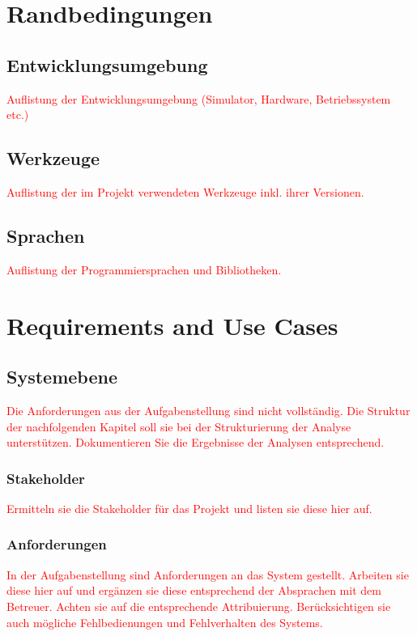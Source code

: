 \documentclass[a4paper, 11pt]{article}
\begin{document}
\section{Randbedingungen}

\subsection{Entwicklungsumgebung}
\textcolor{red}{Auflistung der Entwicklungsumgebung (Simulator, Hardware, Betriebssystem etc.)}

\subsection{Werkzeuge}
\textcolor{red}{Auflistung der im Projekt verwendeten Werkzeuge inkl. ihrer Versionen.}

\subsection{Sprachen}
\textcolor{red}{Auflistung der Programmiersprachen und Bibliotheken.}

\section{Requirements and Use Cases}

\subsection{Systemebene}
\textcolor{red}{Die Anforderungen aus der Aufgabenstellung sind nicht vollständig. Die Struktur der nachfolgenden Kapitel soll sie bei der Strukturierung der Analyse unterstützen. Dokumentieren Sie die Ergebnisse der Analysen entsprechend.}

\subsubsection{Stakeholder}
\textcolor{red}{Ermitteln sie die Stakeholder für das Projekt und listen sie diese hier auf.}

\subsubsection{Anforderungen}
\textcolor{red}{In der Aufgabenstellung sind Anforderungen an das System gestellt. Arbeiten sie diese hier auf und ergänzen sie diese entsprechend der Absprachen mit dem Betreuer. Achten sie auf die entsprechende Attribuierung. 
Berücksichtigen sie auch mögliche Fehlbedienungen und Fehlverhalten des Systems.
}
\end{document}
